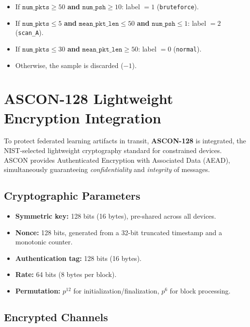 \begin{itemize}
    \item If $\texttt{num\_pkts} \geq 50$ \textbf{and} $\texttt{num\_psh} \geq 10$: label $= 1$ (\texttt{bruteforce}).
    \item If $\texttt{num\_pkts} \leq 5$ \textbf{and} $\texttt{mean\_pkt\_len} \leq 50$ \textbf{and} $\texttt{num\_psh} \leq 1$: label $= 2$ (\texttt{scan\_A}).
    \item If $\texttt{num\_pkts} \leq 30$ \textbf{and} $\texttt{mean\_pkt\_len} \geq 50$: label $= 0$ (\texttt{normal}).
    \item Otherwise, the sample is discarded ($-1$).
\end{itemize}

\section{ASCON-128 Lightweight Encryption Integration}
\label{sec:ascon}

To protect federated learning artifacts in transit, \textbf{ASCON-128} \cite{NISTSP8002322025} is integrated, the NIST-selected lightweight cryptography standard for constrained devices. ASCON provides Authenticated Encryption with Associated Data (AEAD), simultaneously guaranteeing \emph{confidentiality} and \emph{integrity} of messages.

\subsection{Cryptographic Parameters}

\begin{itemize}
    \item \textbf{Symmetric key:} 128 bits (16 bytes), pre-shared across all devices.
    \item \textbf{Nonce:} 128 bits, generated from a 32-bit truncated timestamp and a monotonic counter.
    \item \textbf{Authentication tag:} 128 bits (16 bytes).
    \item \textbf{Rate:} 64 bits (8 bytes per block).
    \item \textbf{Permutation:} $p^{12}$ for initialization/finalization, $p^6$ for block processing.
\end{itemize}

\subsection{Encrypted Channels}

